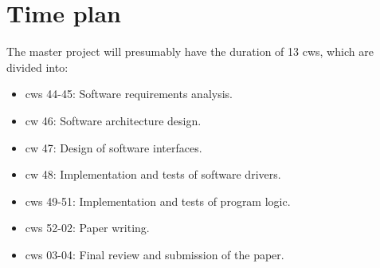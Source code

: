 %
%

\chapter{Time plan}
\label{chap:Time plan}
%
The master project will presumably have the duration of 13 \acp{cw}, which are divided into:

\begin{itemize}
    \item \acsp{cw} 44-45: Software requirements analysis.
    \item \acs{cw} 46: Software architecture design.
    \item \acs{cw} 47: Design of software interfaces.
    \item \acs{cw} 48: Implementation and tests of software drivers.
    \item \acsp{cw} 49-51: Implementation and tests of program logic.
    \item \acsp{cw} 52-02: Paper writing.
    \item \acsp{cw} 03-04: Final review and submission of the paper.
\end{itemize}